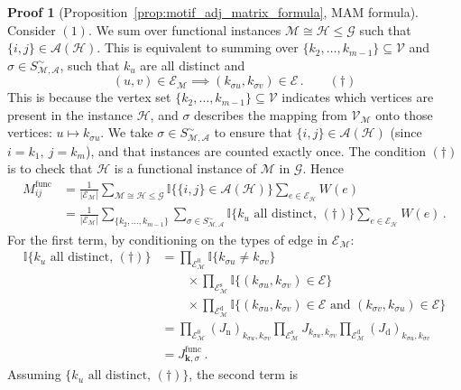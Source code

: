 \documentclass[12pt]{ociamthesis}
\theoremstyle{plain}
\theoremstyle{definition}
\newtheorem{prf}{Proof}[chapter]
\theoremstyle{remark}
\newcommand\bb[1]{\mathbb{#1}}
\newcommand\ca[1]{\mathcal{#1}}
\begin{document}
\begin{prf}[Proposition~\ref{prop:motif_adj_matrix_formula}, MAM formula]
\label{proof:motif_adj_matrix_formula}
%
Consider $(1)$. We sum over functional instances $\ca{M} \cong \ca{H} \leq
\ca{G}$ such that $\{i,j\} \in \ca{A(H)}$.
This is equivalent to summing over $\{k_2, \ldots, k_{m-1}\} \subseteq
\ca{V}$ and $\sigma \in S_\ca{M,A}^\sim$, such that $k_u$ are all distinct
and
%
$$ (u,v) \in \ca{E_M} \implies (k_{\sigma u}, k_{\sigma v}) \in \ca{E}\,.
\qquad (\dagger) $$
%
This is because the vertex set $\{k_2, \ldots, k_{m-1}\} \subseteq \ca{V}$
indicates which vertices are present in the instance $\ca{H}$, and $\sigma$
describes the mapping from $\ca{V_M}$ onto those vertices: $u \mapsto
k_{\sigma u}$. We take $\sigma \in S_\ca{M,A}^\sim$ to ensure that $\{i,j\}
\in \ca{A(H)}$ (since $i=k_1, \ j=k_m$), and that instances are counted
exactly once.
The condition $(\dagger)$ is to check that $\ca{H}$ is a functional instance
of $\ca{M}$ in $\ca{G}$. Hence
%
\begin{align*}
M^\mathrm{func}_{i j} &= \frac{1}{|\ca{E_M}|}
\sum_{\ca{M} \cong \ca{H} \leq
\ca{G}} \bb{I} \big\{ \{i,j\} \in \ca{A}(\ca{H}) \big\} \sum_{e \in
\ca{E_H}} W(e) \\
%
&=  \frac{1}{|\ca{E_M}|} \sum_{\{ k_2, \ldots, k_{m-1} \}} \sum_{\sigma \in
S_\ca{M,A}^\sim} \bb{I} \big\{ k_u \textrm{ all distinct}, \, (\dagger)
\big\} \sum_{e \in \ca{E_H}} W(e)\,.
\end{align*}
%
For the first term, by conditioning on the types of edge in $\ca{E_M}$:
\begin{align*}
%
\bb{I} \big\{ k_u \textrm{ all distinct}, \, (\dagger) \big\}
&= \prod_{\ca{E}_\ca{M}^0} \bb{I} \{ k_{\sigma u} \neq k_{\sigma v} \} \\
& \qquad \times \prod_{\ca{E}_\ca{M}^\mathrm{s}} \bb{I} \{ (k_{\sigma u},
k_{\sigma v}) \in \ca{E} \} \\
& \qquad \times \prod_{\ca{E}_\ca{M}^\mathrm{d}} \bb{I} \{(k_{\sigma u},
k_{\sigma v}) \in \ca{E} \textrm{ and } (k_{\sigma v}, k_{\sigma u}) \in
\ca{E}\} \\
%
&= \prod_{\ca{E}_\ca{M}^0} (J_\mathrm{n})_{k_{\sigma u},k_{\sigma v}}
\prod_{\ca{E}_\ca{M}^\mathrm{s}} J_{k_{\sigma u},k_{\sigma v}}
\prod_{\ca{E}_\ca{M}^\mathrm{d}} (J_\mathrm{d})_{k_{\sigma u},k_{\sigma v}}
\\
%
&= J^\mathrm{func}_{\mathbf{k},\sigma}\,.
%
\end{align*}
%
Assuming $\big\{ k_u \textrm{ all distinct}, \, (\dagger) \big\}$, the second
term is

\end{prf}
\end{document}
